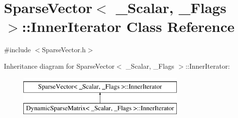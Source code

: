 \hypertarget{class_sparse_vector_1_1_inner_iterator}{\section{Sparse\-Vector$<$ \-\_\-\-Scalar, \-\_\-\-Flags $>$\-:\-:Inner\-Iterator Class Reference}
\label{class_sparse_vector_1_1_inner_iterator}
}


{\ttfamily \#include $<$Sparse\-Vector.\-h$>$}

Inheritance diagram for Sparse\-Vector$<$ \-\_\-\-Scalar, \-\_\-\-Flags $>$\-:\-:Inner\-Iterator\-:\begin{figure}[H]
\begin{center}
\leavevmode
\includegraphics[height=2.000000cm]{class_sparse_vector_1_1_inner_iterator}
\end{center}
\end{figure}
